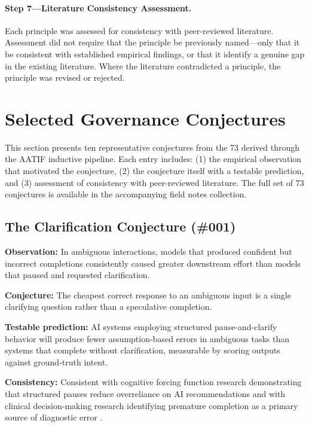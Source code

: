 \documentclass[11pt,a4paper]{article}
\begin{document}
\paragraph{Step 7---Literature Consistency Assessment.}
Each principle was assessed for consistency with peer-reviewed literature. Assessment did not require that the principle be previously named---only that it be consistent with established empirical findings, or that it identify a genuine gap in the existing literature. Where the literature contradicted a principle, the principle was revised or rejected.

\section{Selected Governance Conjectures}

This section presents ten representative conjectures from the 73 derived through the AATIF inductive pipeline. Each entry includes: (1) the empirical observation that motivated the conjecture, (2) the conjecture itself with a testable prediction, and (3) assessment of consistency with peer-reviewed literature. The full set of 73 conjectures is available in the accompanying field notes collection.

\subsection{The Clarification Conjecture (\#001)}

\textbf{Observation:} In ambiguous interactions, models that produced confident but incorrect completions consistently caused greater downstream effort than models that paused and requested clarification.

\textbf{Conjecture:} The cheapest correct response to an ambiguous input is a single clarifying question rather than a speculative completion.

\textbf{Testable prediction:} AI systems employing structured pause-and-clarify behavior will produce fewer assumption-based errors in ambiguous tasks than systems that complete without clarification, measurable by scoring outputs against ground-truth intent.

\textbf{Consistency:} Consistent with cognitive forcing function research demonstrating that structured pauses reduce overreliance on AI recommendations \citep{bucinca2021} and with clinical decision-making research identifying premature completion as a primary source of diagnostic error \citep{croskerry2003}.
\end{document}
